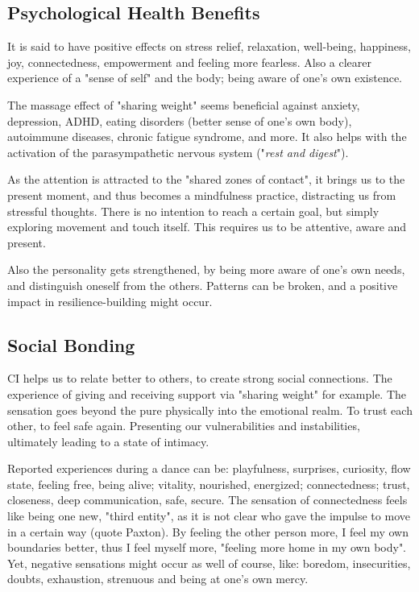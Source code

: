 \subsection{Psychological Health Benefits}

It is said to have positive effects on stress relief, relaxation, well-being, happiness, joy, connectedness, empowerment and feeling more fearless. Also a clearer experience of a "sense of self" and the body; being aware of one's own existence.

The massage effect of "sharing weight" seems beneficial against anxiety, depression, ADHD, eating disorders (better sense of one's own body), autoimmune diseases, chronic fatigue syndrome, and more. It also helps with the activation of the parasympathetic nervous system ("\textit{rest and digest}").

As the attention is attracted to the "shared zones of contact", it brings us to the present moment, and thus becomes a mindfulness practice, distracting us from stressful thoughts. There is no intention to reach a certain goal, but simply exploring movement and touch itself. This requires us to be attentive, aware and present.

Also the personality gets strengthened, by being more aware of one's own needs, and distinguish oneself from the others. Patterns can be broken, and a positive impact in resilience-building might occur.

\subsection{Social Bonding}

CI helps us to relate better to others, to create strong social connections. The experience of giving and receiving support via "sharing weight" for example. The sensation goes beyond the pure physically into the emotional realm. To trust each other, to feel safe again. Presenting our vulnerabilities and instabilities, ultimately leading to a state of intimacy.

Reported experiences during a dance can be: playfulness, surprises, curiosity, flow state, feeling free, being alive; vitality, nourished, energized; connectedness; trust, closeness, deep communication, safe, secure. The sensation of connectedness feels like being one new, "third entity", as it is not clear who gave the impulse to move in a certain way (quote Paxton). By feeling the other person more, I feel my own boundaries better, thus I feel myself more, "feeling more home in my own body". Yet, negative sensations might occur as well of course, like: boredom, insecurities, doubts, exhaustion, strenuous and being at one's own mercy.
